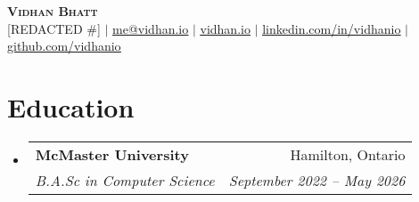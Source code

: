 \documentclass[letterpaper,11pt]{article}
\makeatletter
\newcommand{\resumeItem}[1]{
  \item\small{
    {#1 \vspace{-2pt}}
  }
}
\newcommand{\resumeSubheading}[4]{
  \vspace{-2pt}\item
    \begin{tabular*}{0.97\textwidth}[t]{l@{\extracolsep{\fill}}r}
      \textbf{#1} & #2 \\
      \textit{\small#3} & \textit{\small #4} \\
    \end{tabular*}\vspace{-7pt}
}
\newcommand{\resumeSubSubheading}[2]{
    \item
    \begin{tabular*}{0.97\textwidth}{l@{\extracolsep{\fill}}r}
      \textit{\small#1} & \textit{\small #2} \\
    \end{tabular*}\vspace{-7pt}
}
\newcommand{\resumeSubHeadingListStart}{\begin{itemize}[leftmargin=0.15in, label={}]}
\newcommand{\resumeSubHeadingListEnd}{\end{itemize}}
\newcommand{\resumeItemListStart}{\begin{itemize}}
\newcommand{\resumeItemListEnd}{\end{itemize}\vspace{-5pt}}
\makeatother
\begin{document}

\begin{center}
  \textbf{\Huge \scshape Vidhan Bhatt} \\ \vspace{1pt}
  \small
  [REDACTED \#] $|$
  \href{mailto:me@vidhan.io}{\underline{me@vidhan.io}} $|$
  \href{https://vidhan.io}{\underline{vidhan.io}} $|$
  \href{https://linkedin.com/in/vidhanio}{\underline{linkedin.com/in/vidhanio}} $|$
  \href{https://github.com/vidhanio}{\underline{github.com/vidhanio}}
\end{center}


\section{Education}
\resumeSubHeadingListStart
\resumeSubheading
{McMaster University}{Hamilton, Ontario}
{B.A.Sc in Computer Science}{September 2022 -- May 2026}
\resumeSubHeadingListEnd




\end{document}
